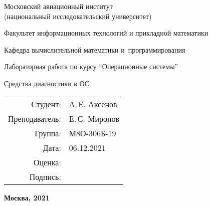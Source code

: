 \begin{titlepage}
\begin{center}
\bfseries

{\Large Московский авиационный институт\\ (национальный исследовательский университет)}

\vspace{48pt}

{\large Факультет информационных технологий и прикладной математики
}

{\large Кафедра вычислительной математики и~программирования}


\vspace{48pt}

Лабораторная работа  по курсу \enquote{Операционные системы}

\vspace{24pt}

{\Large Средства диагностики в ОС}

\end{center}

\vspace{72pt}

\begin{flushright}
\begin{tabular}{rl}
Студент: & А.\,Е. Аксенов \\
Преподаватель: & Е.\,С. Миронов  \\
Группа: & М8О-306Б-19 \\
Дата: & 06.12.2021 \\
Оценка: & \\
Подпись: & \\
\end{tabular}
\end{flushright}

\vfill

\begin{center}
\bfseries
Москва, 2021
\end{center}
\end{titlepage}

\pagebreak
